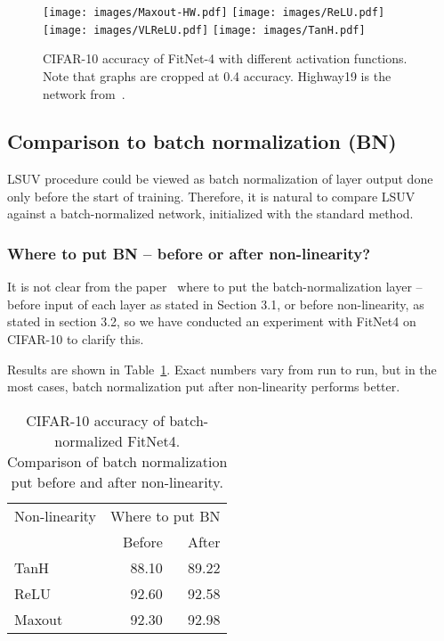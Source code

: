 \documentclass{article} \clearpage{}\usepackage{iclr2016_conference,times}
\begin{document}
\begin{figure}
\centering
\texttt{[image: images/Maxout-HW.pdf]}
\texttt{[image: images/ReLU.pdf]}\\
\texttt{[image: images/VLReLU.pdf]}
\texttt{[image: images/TanH.pdf]}\\
\caption{CIFAR-10 accuracy of FitNet-4 with different activation functions. Note that graphs are cropped at 0.4 accuracy. Highway19 is the network from~\cite{Highway2015}.}
\label{fig:sgd-cifar10}
\end{figure}

\subsection{Comparison to batch normalization (BN)}
LSUV procedure could be viewed as batch normalization of layer output done only before the start of training. Therefore, it is natural to compare LSUV against a batch-normalized network, initialized with the standard method.

\subsubsection{Where to put BN -- before or after non-linearity?}
It is not clear from the paper~\cite{BatchNorm2015} where to put the batch-normalization layer -- before input of each layer as stated in Section 3.1, or before non-linearity, as stated in section 3.2, so we have conducted an experiment with FitNet4 on CIFAR-10 to clarify this.

Results are shown in Table~\ref{tab:before-or-after}. Exact numbers vary from run to run, but in the most cases, batch normalization put after non-linearity performs better. 

\begin{table}[htb]
\centering
\caption{CIFAR-10 accuracy of batch-normalized FitNet4.\\ Comparison of batch normalization put before and after non-linearity.}
\label{tab:before-or-after}
\centering
\begin{tabular}{lrr}
\hline
Non-linearity & \multicolumn{2}{c}{Where to put BN}\\
& Before & After\\
\hline
TanH & 88.10 & 89.22\\
ReLU & 92.60 & 92.58\\
Maxout & 92.30 & 92.98 \\
\hline
\end{tabular}
\end{table}
\end{document}
